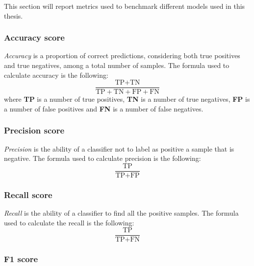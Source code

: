             This section will report metrics used to benchmark different models used in this thesis.

            \subsubsection{Accuracy score}

                \textit{Accuracy} is a proportion of correct predictions, considering both true positives and true negatives, among a total number of samples. The formula used to calculate accuracy is the following:
                \begin{equation}
                    \frac{\text{TP} + \text{TN}}{\text{TP} + \text{TN} + \text{FP} + \text{FN}}
                \end{equation} 
                where \textbf{TP} is a number of true positives, \textbf{TN} is a number of true negatives, \textbf{FP} is a number of false positives and \textbf{FN} is a number of false negatives.

            \subsubsection{Precision score}

                \textit{Precision} is the ability of a classifier not to label as positive a sample that is negative. The formula used to calculate precision is the following:
                \begin{equation}
                    \frac{\text{TP}}{\text{TP} + \text{FP}}
                \end{equation}

            \subsubsection{Recall score}

                \textit{Recall} is the ability of a classifier to find all the positive samples. The formula used to calculate the recall is the following:
                \begin{equation}
                    \frac{\text{TP}}{\text{TP} + \text{FN}}
                \end{equation}

            \subsubsection{F1 score}

